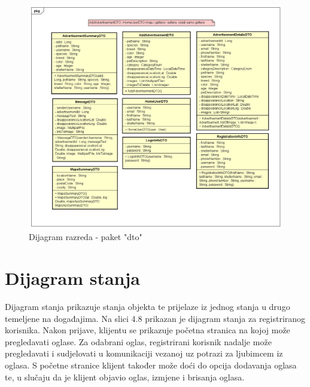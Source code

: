 			\begin{figure}[htb]
				\centering
				\includegraphics[width=\textwidth]{slike/dr4_dto.png}
				\caption{Dijagram razreda - paket "dto"}
			\end{figure}
			\pagebreak

            \clearpage
            \newpage
            \eject
			
		\section{Dijagram stanja}
			
			
			\noindent Dijagram stanja prikazuje stanja objekta te prijelaze iz jednog stanja u drugo temeljene na događajima. Na slici 4.8 prikazan je dijagram stanja za registriranog korisnika. Nakon prijave, klijentu se prikazuje početna stranica na kojoj može pregledavati oglase. Za odabrani oglas, registrirani korisnik nadalje može pregledavati i sudjelovati u komunikaciji vezanoj uz potrazi za ljubimcem iz oglasa. S početne stranice klijent također može doći do opcija dodavanja oglasa te, u slučaju da je klijent objavio oglas, izmjene i brisanja oglasa.
			
